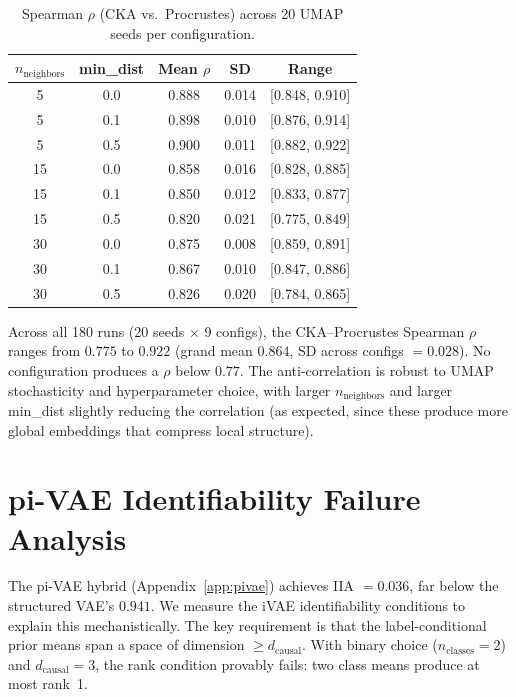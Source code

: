 \documentclass{article}
\begin{document}
\begin{table}[h]
\centering
\small
\caption{Spearman $\rho$ (CKA vs.\ Procrustes) across 20 UMAP seeds per configuration.}
\label{tab:umap}
\begin{tabular}{@{}ccccc@{}}
\toprule
\textbf{$n_{\text{neighbors}}$} & \textbf{min\_dist} & \textbf{Mean $\rho$} & \textbf{SD} & \textbf{Range} \\
\midrule
5 & 0.0 & 0.888 & 0.014 & [0.848, 0.910] \\
5 & 0.1 & 0.898 & 0.010 & [0.876, 0.914] \\
5 & 0.5 & 0.900 & 0.011 & [0.882, 0.922] \\
15 & 0.0 & 0.858 & 0.016 & [0.828, 0.885] \\
15 & 0.1 & 0.850 & 0.012 & [0.833, 0.877] \\
15 & 0.5 & 0.820 & 0.021 & [0.775, 0.849] \\
30 & 0.0 & 0.875 & 0.008 & [0.859, 0.891] \\
30 & 0.1 & 0.867 & 0.010 & [0.847, 0.886] \\
30 & 0.5 & 0.826 & 0.020 & [0.784, 0.865] \\
\bottomrule
\end{tabular}
\end{table}

Across all 180 runs (20 seeds $\times$ 9 configs), the CKA--Procrustes Spearman $\rho$ ranges from $0.775$ to $0.922$ (grand mean $0.864$, SD across configs $= 0.028$). No configuration produces a $\rho$ below $0.77$. The anti-correlation is robust to UMAP stochasticity and hyperparameter choice, with larger $n_{\text{neighbors}}$ and larger min\_dist slightly reducing the correlation (as expected, since these produce more global embeddings that compress local structure).

\section{pi-VAE Identifiability Failure Analysis}
\label{app:ivae-verification}

The pi-VAE hybrid (Appendix~\ref{app:pivae}) achieves IIA $= 0.036$, far below the structured VAE's $0.941$. We measure the iVAE identifiability conditions \citep{khemakhem2020variational} to explain this mechanistically. The key requirement is that the label-conditional prior means span a space of dimension $\geq d_{\text{causal}}$. With binary choice ($n_{\text{classes}} = 2$) and $d_{\text{causal}} = 3$, the rank condition provably fails: two class means produce at most rank~1.
\end{document}
